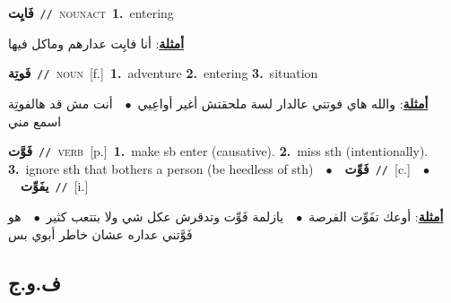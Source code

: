 \documentclass[10pt,a4paper,twoside]{article} %
\begin{document}
\begin{multicols}{2}
{\setlength\topsep{0pt}\textbf{\foreignlanguage{arabic}{فَايِت}}\ {\color{gray}\texttt{//}\color{black}}\ \textsc{noun\textunderscore act}\ \textbf{1.}~entering\  \begin{flushright}\color{gray}\foreignlanguage{arabic}{\textbf{\underline{\foreignlanguage{arabic}{أمثلة}}}: أنا فايِت عدارهم وماكل فيها}\end{flushright}\color{black}} \vspace{2mm}

{\setlength\topsep{0pt}\textbf{\foreignlanguage{arabic}{فَوتِة}}\ {\color{gray}\texttt{//}\color{black}}\ \textsc{noun}\ [f.]\ \textbf{1.}~adventure  \textbf{2.}~entering  \textbf{3.}~situation\  \begin{flushright}\color{gray}\foreignlanguage{arabic}{\textbf{\underline{\foreignlanguage{arabic}{أمثلة}}}: والله هاي فوتتي عالدار لسة ملحقتش أغير أواعِيي\ $\bullet$\ \  أنت مش قد هالفوتِة اسمع مني}\end{flushright}\color{black}} \vspace{2mm}

{\setlength\topsep{0pt}\textbf{\foreignlanguage{arabic}{فَوَّت}}\ {\color{gray}\texttt{//}\color{black}}\ \textsc{verb}\ [p.]\ \textbf{1.}~make sb enter (causative).  \textbf{2.}~miss sth (intentionally).  \textbf{3.}~ignore sth that bothers a person (be heedless of sth)\ \ $\bullet$\ \ \setlength\topsep{0pt}\textbf{\foreignlanguage{arabic}{فَوِّت}}\ {\color{gray}\texttt{//}\color{black}}\ [c.]\ \ $\bullet$\ \ \setlength\topsep{0pt}\textbf{\foreignlanguage{arabic}{يفَوِّت}}\ {\color{gray}\texttt{//}\color{black}}\ [i.]\  \begin{flushright}\color{gray}\foreignlanguage{arabic}{\textbf{\underline{\foreignlanguage{arabic}{أمثلة}}}: أوعك تفَوِّت الفرصة\ $\bullet$\ \  يازلمة فَوِّت وتدقرش عكل شي ولا بتتعب كثير\ $\bullet$\ \  هو فَوَّتني عداره عشان خاطر أبوي بس}\end{flushright}\color{black}} \vspace{2mm}

\vspace{-3mm}
\subsection*{\color{blue}\foreignlanguage{arabic}{ف.و.ج}\color{blue}{}} 


\end{multicols}
\end{document}
